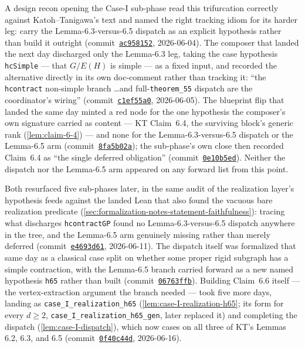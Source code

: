 A design recon opening the Case-I sub-phase read this trifurcation
correctly against Katoh--Tanigawa's text and named the right tracking
idiom for its harder leg: carry the Lemma-6.3-versus-6.5 dispatch as an
explicit hypothesis rather than build it outright
(commit~\href{https://github.com/bryangingechen/CombinatorialRigidity/commit/ac95815277bb846172429337a6919c3ca2c22137}{\texttt{ac958152}},
2026-06-04). The composer that landed the next day discharged only the
Lemma-6.3 leg, taking the case hypothesis \texttt{hcSimple} --- that
$G/E(H)$ is simple --- as a fixed input, and recorded the alternative
directly in its own doc-comment rather than tracking it: ``the
\texttt{hcontract} non-simple branch \dots and full-\texttt{theorem\_55}
dispatch are the coordinator's wiring''
(commit~\href{https://github.com/bryangingechen/CombinatorialRigidity/commit/c1ef55a0e40a40dba6bf30309713901c52f6d321}{\texttt{c1ef55a0}},
2026-06-05). The blueprint flip that landed the same day minted a red
node for the one hypothesis the composer's own signature carried as
content --- KT Claim~6.4, the surviving block's generic rank
(\cref{lem:claim-6-4}) --- and none for the Lemma-6.3-versus-6.5 dispatch
or the Lemma-6.5 arm
(commit~\href{https://github.com/bryangingechen/CombinatorialRigidity/commit/8fa5b02a09a2492ad7d68c8239e6801282d3bce5}{\texttt{8fa5b02a}});
the sub-phase's own close then recorded Claim~6.4 as ``the single
deferred obligation''
(commit~\href{https://github.com/bryangingechen/CombinatorialRigidity/commit/0e10b5ed8209afafa5813038167839f3c21ad15b}{\texttt{0e10b5ed}}).
Neither the dispatch nor the Lemma-6.5 arm appeared on any forward list
from this point.

Both resurfaced five sub-phases later, in the same audit of the
realization layer's hypothesis feeds against the landed Lean that also
found the vacuous bare realization predicate
(\cref{sec:formalization-notes-statement-faithfulness}): tracing what
discharges \texttt{hcontractGP} found no Lemma-6.3-versus-6.5 dispatch
anywhere in the tree, and the Lemma-6.5 arm genuinely missing rather than
merely deferred
(commit~\href{https://github.com/bryangingechen/CombinatorialRigidity/commit/e4693d6170908c480e4f06924f2ea0a95ce9ba3f}{\texttt{e4693d61}},
2026-06-11). The dispatch itself was formalized that same day as a
classical case split on whether some proper rigid subgraph has a simple
contraction, with the Lemma-6.5 branch carried forward as a new named
hypothesis \texttt{h65} rather than built
(commit~\href{https://github.com/bryangingechen/CombinatorialRigidity/commit/06763ffbe96f89ab5d9ea039608c752611fe6c16}{\texttt{06763ffb}}).
Building Claim~6.6 itself --- the vertex-extraction argument the branch
needed --- took five more days, landing as
\texttt{case\_I\_realization\_h65} (\cref{lem:case-I-realization-h65}; its form for
every $d \ge 2$, \texttt{case\_I\_realization\_h65\_gen}, later replaced it)
and completing the dispatch (\cref{lem:case-I-dispatch}), which now cases
on all three of KT's Lemmas 6.2, 6.3, and 6.5
(commit~\href{https://github.com/bryangingechen/CombinatorialRigidity/commit/0f40c44dfa79c660e03376341bef65baca2c2ecf}{\texttt{0f40c44d}},
2026-06-16).

